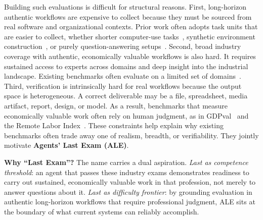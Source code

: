 Building such evaluations is difficult for structural reasons. First, long-horizon authentic workflows are expensive to collect because they must be sourced from real software and organizational contexts. Prior work often adopts task units that are easier to collect, whether shorter computer-use tasks~\citep{xie2024osworld}, synthetic environment construction~\citep{aggarwal2026gymanything}, or purely question-answering setups~\citep{yang2026onemillionbench}. Second, broad industry coverage with authentic, economically valuable workflows is also hard. It requires sustained access to experts across domains and deep insight into the industrial landscape. Existing benchmarks often evaluate on a limited set of domains~\citep{alphaeval2026}. Third, verification is intrinsically hard for real workflows because the output space is heterogeneous. A correct deliverable may be a file, spreadsheet, media artifact, report, design, or model. As a result, benchmarks that measure economically valuable work often rely on human judgment, as in GDPval~\citep{patwardhan2025gdpval} and the Remote Labor Index~\citep{mazeika2025rli}. These constraints help explain why existing benchmarks often trade away one of realism, breadth, or verifiability. They jointly motivate \textbf{Agents' Last Exam (ALE)}.

\begin{lastexambox}
\textbf{Why ``Last Exam''?}\enspace
The name carries a dual aspiration.
\emph{Last as competence threshold}: an agent that passes these industry exams demonstrates readiness to carry out sustained, economically valuable work in that profession, not merely to answer questions about it.
\emph{Last as difficulty frontier}: by grounding evaluation in authentic long-horizon workflows that require professional judgment, ALE sits at the boundary of what current systems can reliably accomplish.
\end{lastexambox}

